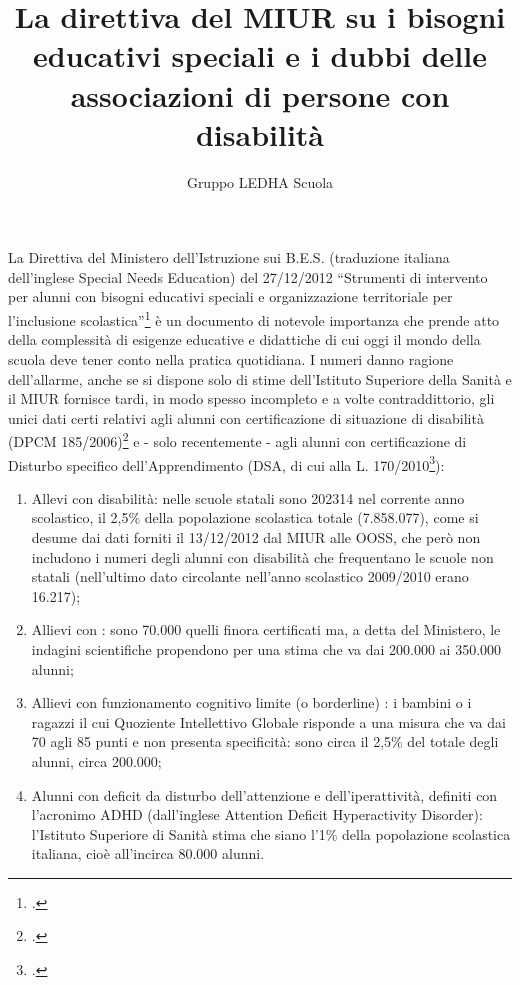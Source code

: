 \author{Gruppo LEDHA Scuola}
\title{La  direttiva  del  MIUR  su i bisogni educativi speciali e i dubbi delle associazioni di persone con disabilità}
\label{cha:ledha110213}

\maketitle
La Direttiva del Ministero dell'Istruzione sui B.E.S. (traduzione italiana dell'inglese Special Needs
Education) del 27/12/2012 “Strumenti di intervento per alunni con bisogni educativi speciali e
organizzazione territoriale per l'inclusione scolastica”\footcite{dir27Dic2012}
 è un documento di notevole importanza che prende
atto della complessità di esigenze educative e didattiche di cui oggi il mondo della scuola deve
tener conto nella pratica quotidiana.
I numeri danno ragione dell'allarme, anche se si dispone solo di stime dell'Istituto Superiore della
Sanità e il MIUR fornisce tardi, in modo spesso incompleto e a volte contraddittorio, gli unici dati
certi relativi agli alunni con certificazione di situazione di disabilità (DPCM 185/2006)\footcite{DPCM22_02_06_N_185} e - solo
recentemente - agli alunni con certificazione di Disturbo specifico dell'Apprendimento (DSA, di
cui alla L. 170/2010\footcite{legge170}):
\begin{enumerate}
	\item  Allevi con disabilità: nelle scuole statali sono 202314 nel corrente anno scolastico, il 2,5\%
	della popolazione scolastica totale (7.858.077), come si desume dai dati  forniti il
	13/12/2012 dal MIUR alle OOSS, che però non includono i numeri degli alunni con
	disabilità che frequentano le scuole non statali (nell'ultimo dato circolante nell'anno
	scolastico 2009/2010 erano 16.217);
	\item Allievi con : sono 70.000 quelli finora certificati ma, a detta del Ministero, le indagini
	scientifiche propendono per una stima che va dai 200.000 ai 350.000 alunni;
	\item Allievi con funzionamento cognitivo limite (o borderline) : i bambini o i ragazzi il cui
	Quoziente Intellettivo Globale risponde a una misura che va dai 70 agli 85 punti e non
	presenta specificità: sono circa il 2,5\% del totale degli alunni, circa 200.000;
	\item  Alunni con deficit da disturbo dell'attenzione e dell'iperattività, definiti con l’acronimo
	ADHD (dall'inglese Attention Deficit Hyperactivity Disorder): l'Istituto Superiore di Sanità
	stima che siano l’1\% della popolazione scolastica italiana, cioè all'incirca 80.000 alunni.
\end{enumerate}

